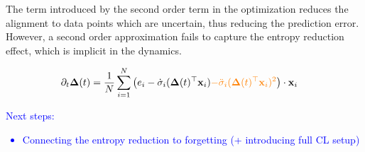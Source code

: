 \documentclass{article} %
\begin{document}
The term introduced by the second order term in the optimization reduces the alignment to data points which are uncertain, thus reducing the prediction error. However, a second order approximation fails to capture the entropy reduction effect, which is implicit in the dynamics.

\begin{align}
    \partial_t \mbox{$\mbox{$\boldsymbol{\Delta}$}$}(t)  
    &= \frac{1}{N} \sum_{i=1}^N \left(e_i - \dot\sigma_i (\mbox{$\mbox{$\boldsymbol{\Delta}$}$}(t)^\top \mbox{$\mbox{$\mathbf{x}$}$}_i)  \textcolor{orange}{-\ddot\sigma_i  (\mbox{$\mbox{$\boldsymbol{\Delta}$}$}(t)^\top \mbox{$\mbox{$\mathbf{x}$}$}_i)^2}\right)\cdot \mbox{$\mbox{$\mathbf{x}$}$}_i
\end{align}

\textcolor{blue}{Next steps: 
\begin{itemize}
    \item Connecting the entropy reduction to forgetting (+ introducing full CL setup)
\end{itemize}
}
\end{document}
